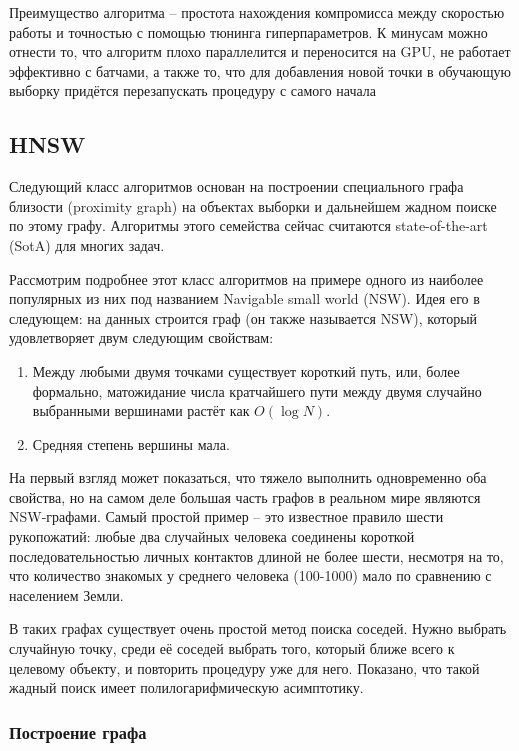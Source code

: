 Преимущество алгоритма -- простота нахождения компромисса между скоростью работы и точностью с помощью тюнинга
гиперпараметров.
К минусам можно отнести то, что алгоритм плохо параллелится и переносится на GPU, не работает эффективно с батчами,
а также то, что для добавления новой точки в обучающую выборку придётся перезапускать процедуру с самого начала

\subsection{HNSW}

Следующий класс алгоритмов основан на построении специального графа близости (proximity graph) на объектах выборки
и дальнейшем жадном поиске по этому графу.
Алгоритмы этого семейства сейчас считаются state-of-the-art (SotA) для многих задач.

Рассмотрим подробнее этот класс алгоритмов на примере одного из наиболее популярных из них под названием
Navigable small world (NSW).
Идея его в следующем: на данных строится граф (он также называется NSW), который удовлетворяет двум следующим
свойствам:

\begin{enumerate}
    \item Между любыми двумя точками существует короткий путь, или, более формально, матожидание числа кратчайшего
    пути между двумя случайно выбранными вершинами растёт как $O(\log N)$.
    \item Средняя степень вершины мала.
\end{enumerate}

На первый взгляд может показаться, что тяжело выполнить одновременно оба свойства, но на самом деле большая часть
графов в реальном мире являются NSW-графами.
Самый простой пример -- это известное правило шести рукопожатий: любые два случайных человека соединены короткой
последовательностью личных контактов длиной не более шести, несмотря на то, что количество знакомых у среднего
человека (100-1000) мало по сравнению с населением Земли.

В таких графах существует очень простой метод поиска соседей.
Нужно выбрать случайную точку, среди её соседей выбрать того, который ближе всего к целевому объекту, и повторить
процедуру уже для него.
Показано, что такой жадный поиск имеет полилогарифмическую асимптотику.

\subsubsection{Построение графа}


